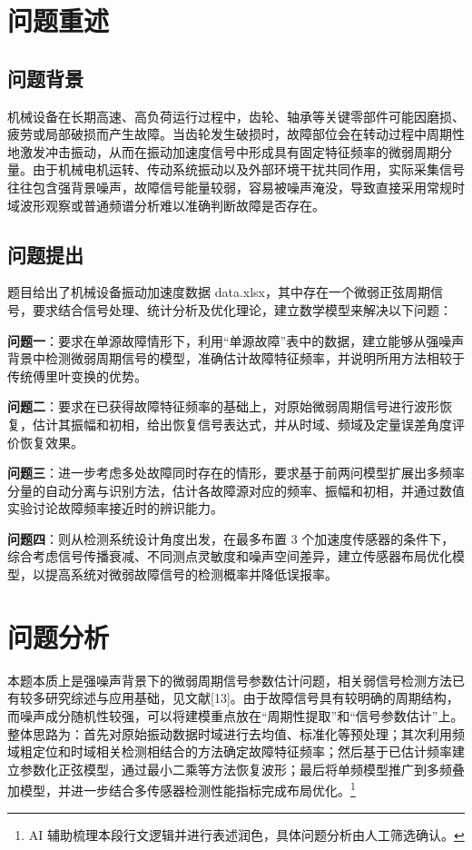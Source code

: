 \documentclass[UTF8,a4paper,12pt]{ctexart}
\numberwithin{figure}{section}
\numberwithin{table}{section}
\newcommand{\ainote}[1]{\footnote{\small #1}}
\begin{document}
\clearpage

\tableofcontents
\clearpage

\section{问题重述}
\subsection{问题背景}
机械设备在长期高速、高负荷运行过程中，齿轮、轴承等关键零部件可能因磨损、疲劳或局部破损而产生故障。当齿轮发生破损时，故障部位会在转动过程中周期性地激发冲击振动，从而在振动加速度信号中形成具有固定特征频率的微弱周期分量。由于机械电机运转、传动系统振动以及外部环境干扰共同作用，实际采集信号往往包含强背景噪声，故障信号能量较弱，容易被噪声淹没，导致直接采用常规时域波形观察或普通频谱分析难以准确判断故障是否存在。

\subsection{问题提出}
题目给出了机械设备振动加速度数据 data.xlsx，其中存在一个微弱正弦周期信号，要求结合信号处理、统计分析及优化理论，建立数学模型来解决以下问题：

\textbf{问题一}：要求在单源故障情形下，利用“单源故障”表中的数据，建立能够从强噪声背景中检测微弱周期信号的模型，准确估计故障特征频率，并说明所用方法相较于传统傅里叶变换的优势。

\textbf{问题二}：要求在已获得故障特征频率的基础上，对原始微弱周期信号进行波形恢复，估计其振幅和初相，给出恢复信号表达式，并从时域、频域及定量误差角度评价恢复效果。

\textbf{问题三}：进一步考虑多处故障同时存在的情形，要求基于前两问模型扩展出多频率分量的自动分离与识别方法，估计各故障源对应的频率、振幅和初相，并通过数值实验讨论故障频率接近时的辨识能力。

\textbf{问题四}：则从检测系统设计角度出发，在最多布置 3 个加速度传感器的条件下，综合考虑信号传播衰减、不同测点灵敏度和噪声空间差异，建立传感器布局优化模型，以提高系统对微弱故障信号的检测概率并降低误报率。

\section{问题分析}
本题本质上是强噪声背景下的微弱周期信号参数估计问题，相关弱信号检测方法已有较多研究综述与应用基础，见文献[13]。由于故障信号具有较明确的周期结构，而噪声成分随机性较强，可以将建模重点放在“周期性提取”和“信号参数估计”上。整体思路为：首先对原始振动数据时域进行去均值、标准化等预处理；其次利用频域粗定位和时域相关检测相结合的方法确定故障特征频率；然后基于已估计频率建立参数化正弦模型，通过最小二乘等方法恢复波形；最后将单频模型推广到多频叠加模型，并进一步结合多传感器检测性能指标完成布局优化。\ainote{AI 辅助梳理本段行文逻辑并进行表述润色，具体问题分析由人工筛选确认。}
\end{document}
